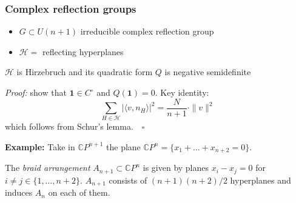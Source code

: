\documentclass{beamer}
\newcommand{\mH}{\mathcal{H}}
\begin{document}
\begin{frame}
	\frametitle{Complex reflection groups}
	\begin{itemize}
		\item \(G \subset U(n+1)\) irreducible complex reflection group
		\item \(\mH = \) reflecting hyperplanes
	\end{itemize}
\pause
	\begin{theorem}[dB-Panov, 2024]
		\(\mH\) is Hirzebruch and its quadratic form \(Q\) is negative semidefinite
	\end{theorem}
	
\pause	
	\emph{Proof:} show that \(\mathbf{1} \in C^{\circ}\) and \(Q(\mathbf{1}) = 0\). Key identity:
	\[
	\sum_{H \in \mH} | \langle v, n_H \rangle |^2 = \frac{N}{n+1} \cdot \| v \|^2  
	\]
	which follows from Schur's lemma. \,\, \(\square\)
	
\pause	
\vfill
	\textbf{Example:} Take in $\mathbb CP^{n+1}$ the plane $\mathbb CP^n=\{x_1+\ldots+x_{n+2}=0\}$.
	
	The \emph{braid arrangement} $A_{n+1}\subset\mathbb CP^n$ is given by planes $x_i-x_j=0$ for $i\ne j\in \{1,\ldots,n+2\}$.
	$A_{n+1}$ consists of $(n+1)(n+2)/2$ hyperplanes and induces $A_n$ on each of them.
\end{frame}
\end{document}
